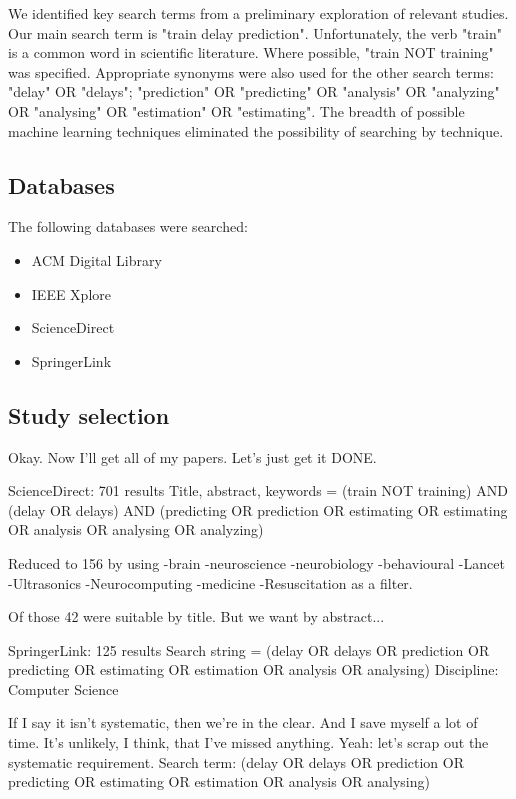 \documentclass{article}
\begin{document}
We identified key search terms from a preliminary exploration of relevant studies. Our main search term is "train delay prediction". Unfortunately, the verb "train" is a common word in scientific literature. Where possible, "train NOT training" was specified.
Appropriate synonyms were also used for the other search terms: "delay" OR "delays"; "prediction" OR "predicting" OR "analysis" OR "analyzing" OR "analysing" OR "estimation" OR "estimating". The breadth of possible machine learning techniques eliminated the possibility of searching by technique. 

\subsection{Databases}

The following databases were searched:

\begin{itemize}
	\item ACM Digital Library
	\item IEEE Xplore
	\item ScienceDirect
	\item SpringerLink
\end{itemize}


\subsection{Study selection}

Okay. Now I'll get all of my papers. Let's just get it DONE. 

ScienceDirect: 701 results
Title, abstract, keywords = (train NOT training) AND (delay OR delays) AND (predicting OR prediction OR estimating OR estimating OR analysis OR analysing OR analyzing)

Reduced to 156 by using -brain -neuroscience -neurobiology -behavioural -Lancet -Ultrasonics -Neurocomputing -medicine -Resuscitation as a filter.

Of those 42 were suitable by title. But we want by abstract...

SpringerLink: 125 results
Search string = (delay OR delays OR prediction OR predicting OR estimating OR estimation OR analysis OR analysing)
Discipline: Computer Science



If I say it isn't systematic, then we're in the clear. And I save myself a lot of time. It's unlikely, I think, that I've missed anything.
Yeah: let's scrap out the systematic requirement. 
Search term: (delay OR delays OR prediction OR predicting OR estimating OR estimation OR analysis OR analysing)
\end{document}
